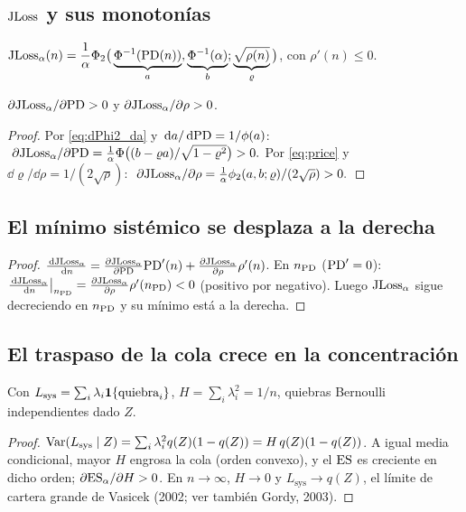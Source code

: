 \subsection{\texorpdfstring{$\mathrm{JLoss}$}{JLoss} y sus monotonías}\label{sec:jl-A}
$\displaystyle \mathrm{JLoss}_\alpha(n)=\frac1\alpha\Phi_2\big(\underbrace{\Phi^{-1}(\mathrm{PD}(n))}_{a},\underbrace{\Phi^{-1}(\alpha)}_{b};\underbrace{\sqrt{\rho(n)}}_{\varrho}\big)$, con $\rho'(n)\le0$.
\begin{lemma}\label{lem:jl-A}
$\partial\mathrm{JLoss}_\alpha/\partial\mathrm{PD}>0$ y $\partial\mathrm{JLoss}_\alpha/\partial\rho>0$.
\end{lemma}
\begin{proof}
Por \eqref{eq:dPhi2_da} y $\,\mathrm{d} a/\,\mathrm{d}\mathrm{PD}=1/\phi(a)$: $\ \partial\JLoss_\alpha/\partial\PD=\frac1\alpha\Phi\big((b-\varrho a)/\sqrt{1-\varrho^2}\big)>0.$ Por \eqref{eq:price} y $\dd\varrho/\dd\rho=1/(2\sqrt\rho)$: $\ \partial\JLoss_\alpha/\partial\rho=\frac1\alpha\phi_2(a,b;\varrho)/(2\sqrt\rho)>0.$
\end{proof}

\subsection{El mínimo sistémico se desplaza a la derecha}
\begin{proof}
$\frac{\,\mathrm{d}\mathrm{JLoss}_\alpha}{\,\mathrm{d} n}=\frac{\partial\mathrm{JLoss}_\alpha}{\partial\mathrm{PD}}\mathrm{PD}'(n)+\frac{\partial\mathrm{JLoss}_\alpha}{\partial\rho}\rho'(n)$. En $n_{\mathrm{PD}}$ ($\mathrm{PD}'=0$): $\frac{\,\mathrm{d}\mathrm{JLoss}_\alpha}{\,\mathrm{d} n}\big|_{n_{\mathrm{PD}}}=\frac{\partial\mathrm{JLoss}_\alpha}{\partial\rho}\rho'(n_{\mathrm{PD}})<0$ (positivo por negativo). Luego $\mathrm{JLoss}_\alpha$ sigue decreciendo en $n_{\mathrm{PD}}$ y su mínimo está a la derecha.
\end{proof}

\subsection{El traspaso de la cola crece en la concentración}\label{sec:gran-A}
Con $L_{\text{sys}}=\sum_i\lambda_i\mathbf{1}\{\text{quiebra}_i\}$, $H=\sum_i\lambda_i^2=1/n$, quiebras Bernoulli independientes dado $Z$.
\begin{proof}
$\mathrm{Var}(L_{\text{sys}}\mid Z)=\sum_i\lambda_i^2 q(Z)(1-q(Z))=H\,q(Z)(1-q(Z))$. A igual media condicional, mayor $H$ engrosa la cola (orden convexo), y el $\mathrm{ES}$ es creciente en dicho orden; $\partial\mathrm{ES}_\alpha/\partial H>0$. En $n\to\infty$, $H\to0$ y $L_{\text{sys}}\to q(Z)$, el límite de cartera grande de Vasicek (2002; ver también Gordy, 2003).
\end{proof}

